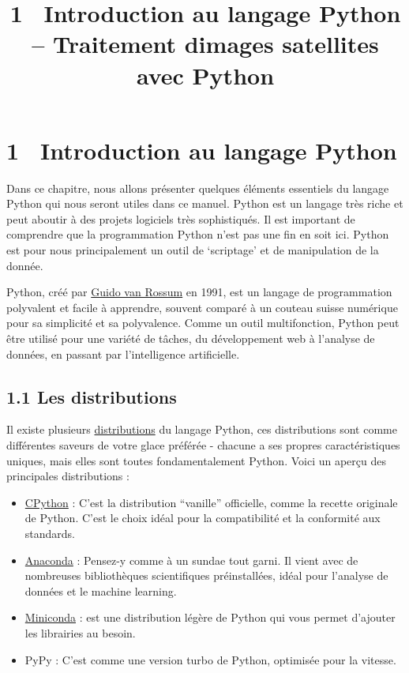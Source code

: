 \documentclass[
]{article}
\title{1~ Introduction au langage Python -- Traitement
d\textquotesingle images satellites avec Python}
\author{}
\date{}
\begin{document}
\maketitle

\label{quarto-document-content}
\label{title-block-header}
\section{\texorpdfstring{\protect\hypertarget{sec-chap00}{}{{1}~
{Introduction au langage
Python}}}{1~ Introduction au langage Python}}\label{introduction-au-langage-python}

Dans ce chapitre, nous allons présenter quelques éléments essentiels du
langage Python qui nous seront utiles dans ce manuel. Python est un
langage très riche et peut aboutir à des projets logiciels très
sophistiqués. Il est important de comprendre que la programmation Python
n'est pas une fin en soit ici. Python est pour nous principalement un
outil de `scriptage' et de manipulation de la donnée.

Python, créé par
\href{https://en.wikipedia.org/wiki/Guido_van_Rossum}{Guido van Rossum}
en 1991, est un langage de programmation polyvalent et facile à
apprendre, souvent comparé à un couteau suisse numérique pour sa
simplicité et sa polyvalence. Comme un outil multifonction, Python peut
être utilisé pour une variété de tâches, du développement web à
l'analyse de données, en passant par l'intelligence artificielle.

\subsection{\texorpdfstring{{1.1} Les
distributions}{1.1 Les distributions}}\label{les-distributions}

Il existe plusieurs
\href{https://wiki.python.org/moin/PythonDistributions}{distributions}
du langage Python, ces distributions sont comme différentes saveurs de
votre glace préférée - chacune a ses propres caractéristiques uniques,
mais elles sont toutes fondamentalement Python. Voici un aperçu des
principales distributions :

\begin{itemize}
\item
  \href{https://www.python.org/downloads/}{CPython} : C'est la
  distribution ``vanille'' officielle, comme la recette originale de
  Python. C'est le choix idéal pour la compatibilité et la conformité
  aux standards.
\item
  \href{https://www.anaconda.com/download}{Anaconda} : Pensez-y comme à
  un sundae tout garni. Il vient avec de nombreuses bibliothèques
  scientifiques préinstallées, idéal pour l'analyse de données et le
  machine learning.
\item
  \href{https://docs.anaconda.com/miniconda/miniconda-install/}{Miniconda}
  : est une distribution légère de Python qui vous permet d'ajouter les
  librairies au besoin.
\item
  PyPy : C'est comme une version turbo de Python, optimisée pour la
  vitesse.
\end{itemize}
\end{document}
